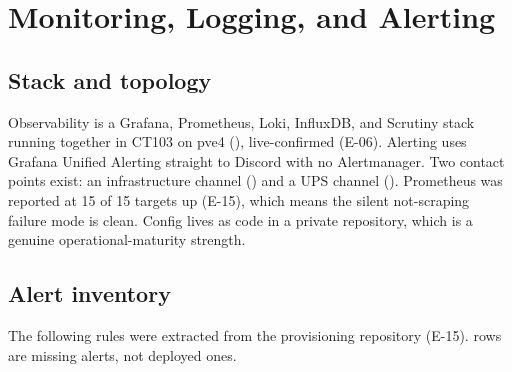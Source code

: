 \section{Monitoring, Logging, and Alerting}\label{sec:monitoring}

\subsection{Stack and topology}

Observability is a Grafana, Prometheus, Loki, InfluxDB, and Scrutiny stack running together in
CT103 on pve4 (), live-confirmed (E-06). Alerting uses Grafana Unified
Alerting straight to Discord with no Alertmanager. Two contact points exist: an infrastructure
channel () and a UPS channel (). Prometheus was reported
at 15 of 15 targets up (E-15), which means the silent not-scraping failure mode is clean.
Config lives as code in a private repository, which is a genuine operational-maturity strength.

\subsection{Alert inventory}

The following rules were extracted from the provisioning repository (E-15).  rows are
missing alerts, not deployed ones.

